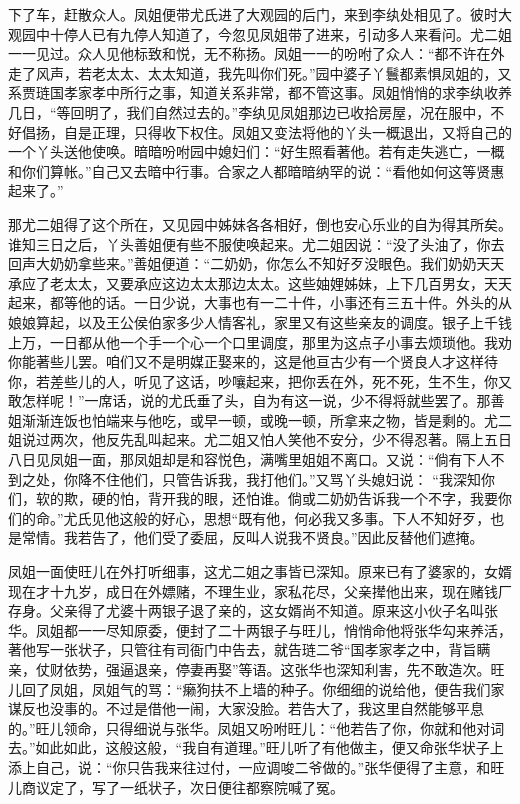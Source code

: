 \begin{parag}
    下了车，赶散众人。凤姐便带尤氏进了大观园的后门，来到李纨处相见了。彼时大观园中十停人已有九停人知道了，今忽见凤姐带了进来，引动多人来看问。尤二姐一一见过。众人见他标致和悦，无不称扬。凤姐一一的吩咐了众人：“都不许在外走了风声，若老太太、太太知道，我先叫你们死。”园中婆子丫鬟都素惧凤姐的，又系贾琏国孝家孝中所行之事，知道关系非常，都不管这事。凤姐悄悄的求李纨收养几日，“等回明了，我们自然过去的。”李纨见凤姐那边已收拾房屋，况在服中，不好倡扬，自是正理，只得收下权住。凤姐又变法将他的丫头一概退出，又将自己的一个丫头送他使唤。暗暗吩咐园中媳妇们：“好生照看著他。若有走失逃亡，一概和你们算帐。”自己又去暗中行事。合家之人都暗暗纳罕的说：“看他如何这等贤惠起来了。”
\end{parag}


\begin{parag}
    那尤二姐得了这个所在，又见园中姊妹各各相好，倒也安心乐业的自为得其所矣。谁知三日之后，丫头善姐便有些不服使唤起来。尤二姐因说：“没了头油了，你去回声大奶奶拿些来。”善姐便道：“二奶奶，你怎么不知好歹没眼色。我们奶奶天天承应了老太太，又要承应这边太太那边太太。这些妯娌姊妹，上下几百男女，天天起来，都等他的话。一日少说，大事也有一二十件，小事还有三五十件。外头的从娘娘算起，以及王公侯伯家多少人情客礼，家里又有这些亲友的调度。银子上千钱上万，一日都从他一个手一个心一个口里调度，那里为这点子小事去烦琐他。我劝你能著些儿罢。咱们又不是明媒正娶来的，这是他亘古少有一个贤良人才这样待你，若差些儿的人，听见了这话，吵嚷起来，把你丢在外，死不死，生不生，你又敢怎样呢！”一席话，说的尤氏垂了头，自为有这一说，少不得将就些罢了。那善姐渐渐连饭也怕端来与他吃，或早一顿，或晚一顿，所拿来之物，皆是剩的。尤二姐说过两次，他反先乱叫起来。尤二姐又怕人笑他不安分，少不得忍著。隔上五日八日见凤姐一面，那凤姐却是和容悦色，满嘴里姐姐不离口。又说：“倘有下人不到之处，你降不住他们，只管告诉我，我打他们。”又骂丫头媳妇说： “我深知你们，软的欺，硬的怕，背开我的眼，还怕谁。倘或二奶奶告诉我一个不字，我要你们的命。”尤氏见他这般的好心，思想“既有他，何必我又多事。下人不知好歹，也是常情。我若告了，他们受了委屈，反叫人说我不贤良。”因此反替他们遮掩。
\end{parag}


\begin{parag}
    凤姐一面使旺儿在外打听细事，这尤二姐之事皆已深知。原来已有了婆家的，女婿现在才十九岁，成日在外嫖赌，不理生业，家私花尽，父亲撵他出来，现在赌钱厂存身。父亲得了尤婆十两银子退了亲的，这女婿尚不知道。原来这小伙子名叫张华。凤姐都一一尽知原委，便封了二十两银子与旺儿，悄悄命他将张华勾来养活，著他写一张状子，只管往有司衙门中告去，就告琏二爷“国孝家孝之中，背旨瞒亲，仗财依势，强逼退亲，停妻再娶”等语。这张华也深知利害，先不敢造次。旺儿回了凤姐，凤姐气的骂：“癞狗扶不上墙的种子。你细细的说给他，便告我们家谋反也没事的。不过是借他一闹，大家没脸。若告大了，我这里自然能够平息的。”旺儿领命，只得细说与张华。凤姐又吩咐旺儿：“他若告了你，你就和他对词去。”如此如此，这般这般，“我自有道理。”旺儿听了有他做主，便又命张华状子上添上自己，说：“你只告我来往过付，一应调唆二爷做的。”张华便得了主意，和旺儿商议定了，写了一纸状子，次日便往都察院喊了冤。
\end{parag}


